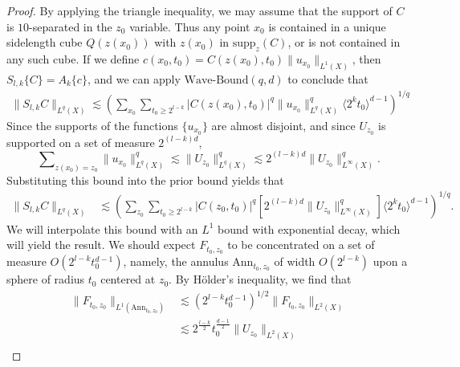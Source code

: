 \begin{proof}
    By applying the triangle inequality, we may assume that the support of $C$ is $10$-separated in the $z_0$ variable. Thus any point $x_0$ is contained in a unique sidelength cube $Q(z(x_0))$ with $z(x_0)$ in $\text{supp}_z(C)$, or is not contained in any such cube. If we define $c(x_0,t_0) = C(z(x_0),t_0) \| u_{x_0} \|_{L^1(X)}$, then $S_{l,k} \{ C \} = A_k \{ c \}$, and we can apply $\text{Wave-Bound}(q,d)$ to conclude that
    \begin{align*}
      \| S_{l,k} C \|_{L^q(X)} \lesssim \left( \sum\nolimits_{x_0} \sum\nolimits_{t_0 \geq 2^{l-k}} |C(z(x_0),t_0)|^q \| u_{x_0} \|_{L^q(X)}^q \langle 2^k t_0 \rangle^{d-1} \right)^{1/q}
    \end{align*}
    Since the supports of the functions $\{ u_{x_0} \}$ are almost disjoint, and since $U_{z_0}$ is supported on a set of measure $2^{(l-k)d}$,
    \[ \sum\nolimits_{z(x_0) = z_0} \| u_{x_0} \|_{L^q(X)}^q \lesssim \| U_{z_0} \|_{L^q(X)}^q \lesssim 2^{(l-k)d} \| U_{z_0} \|_{L^\infty(X)}^q. \]
    Substituting this bound into the prior bound yields that
    \begin{align*}
        \| S_{l,k} C \|_{L^q(X)} &\lesssim \left( \sum\nolimits_{z_0} \sum\nolimits_{t_0 \geq 2^{l-k}} |C(z_0,t_0)|^q \left[ 2^{(l-k)d} \| U_{z_0} \|_{L^\infty(X)}^q \right] \langle 2^k t_0 \rangle^{d-1} \right)^{1/q}.
    \end{align*}
    We will interpolate this bound with an $L^1$ bound with exponential decay, which will yield the result. We should expect $F_{t_0,z_0}$ to be concentrated on a set of measure $O( 2^{l-k} t_0^{d-1} )$, namely, the annulus $\text{Ann}_{t_0,z_0}$ of width $O(2^{l-k})$ upon a sphere of radius $t_0$ centered at $z_0$. By H\"{o}lder's inequality, we find that
    \begin{align*}
        \| F_{t_0,z_0} \|_{L^1(\text{Ann}_{t_0,z_0})} &\lesssim \left( 2^{l-k} t_0^{d-1} \right)^{1/2} \| F_{t_0,z_0} \|_{L^2(X)}\\
        &\lesssim 2^{\frac{l-k}{2}} t_0^{\frac{d-1}{2}} \| U_{z_0} \|_{L^2(X)}\\

\end{align*}
\end{proof}
